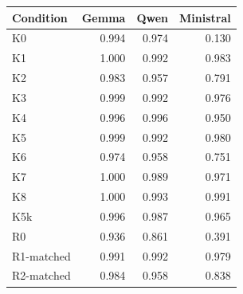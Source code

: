\begin{tabular}{lrrr}
\toprule
Condition & Gemma & Qwen & Ministral \\
\midrule
K0 & 0.994 & 0.974 & 0.130 \\
K1 & 1.000 & 0.992 & 0.983 \\
K2 & 0.983 & 0.957 & 0.791 \\
K3 & 0.999 & 0.992 & 0.976 \\
K4 & 0.996 & 0.996 & 0.950 \\
K5 & 0.999 & 0.992 & 0.980 \\
K6 & 0.974 & 0.958 & 0.751 \\
K7 & 1.000 & 0.989 & 0.971 \\
K8 & 1.000 & 0.993 & 0.991 \\
K5k & 0.996 & 0.987 & 0.965 \\
R0 & 0.936 & 0.861 & 0.391 \\
R1-matched & 0.991 & 0.992 & 0.979 \\
R2-matched & 0.984 & 0.958 & 0.838 \\
\bottomrule
\end{tabular}
